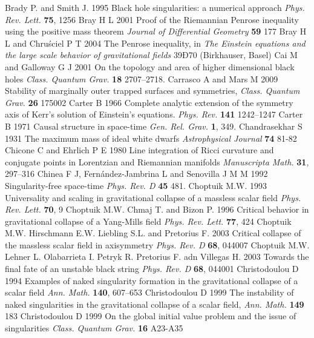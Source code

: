 \documentclass[12pt]{iopart}
\begin{document}
\begin{thebibliography}{999}
 Brady P. and Smith J. 1995 Black hole singularities: a numerical approach {\it Phys. Rev. Lett.} {\bf 75}, 1256
 Bray H L 2001 Proof of the Riemannian Penrose inequality using the positive mass theorem {\it Journal of Differential Geometry} {\bf 59} 177
 Bray H L and Chru\'{s}ciel P T 2004 The Penrose inequality, in {\it The Einstein equations and the large scale behavior of gravitational fields} 39Ð70 (Birkhauser, Basel)
 Cai M and Galloway G J 2001 On the topology and area of higher dimensional black holes {\it Class. Quantum Grav.} {\bf 18} 2707--2718.%
 Carrasco A and Mars M 2009 Stability of marginally outer trapped surfaces and symmetries, {\it Class. Quantum Grav.} {\bf 26} 175002 
 Carter B 1966 Complete analytic extension of the symmetry axis of Kerr's solution of Einstein's equations. {\it Phys. Rev.} {\bf 141} 1242--1247
 Carter B 1971 Causal structure in space-time {\it Gen. Rel. Grav.} {\bf 1}, 349.%
 Chandrasekhar S 1931 The maximum mass of ideal white dwarfs {\it Astrophysical Journal} {\bf 74} 81-82
 Chicone C and Ehrlich P E 1980 Line integration of Ricci curvature and conjugate points in Lorentzian and Riemannian manifolds {\it Manuscripta Math.} {\bf 31},
297--316
 Chinea F J, Fern\'andez-Jambrina L and Senovilla J M M
1992 Singularity-free space-time {\it Phys. Rev. D} {\bf 45} 481.
 Choptuik M.W. 1993 Universality and scaling in gravitational collapse of a massless scalar field {\it Phys. Rev. Lett.} {\bf 70}, 9
 Choptuik M.W. Chmaj T. and Bizon P. 1996 Critical behavior in gravitational collapse of a Yang-Mills field {\it Phys. Rev. Lett.} {\bf 77}, 424
 Choptuik M.W. Hirschmann E.W. Liebling S.L. and Pretorius F. 2003 Critical collapse of the massless scalar field in axisymmetry {\it Phys. Rev. D} {\bf 68}, 044007
 Choptuik M.W. Lehner L. Olabarrieta I. Petryk R. Pretorius F. adn Villegas H. 2003 Towards the final fate of an unstable black string {\it Phys. Rev. D} {\bf 68}, 044001
 Christodoulou D 1994 Examples of naked singularity formation in the gravitational collapse of a scalar field {\it Ann. Math.} {\bf 140}, 607--653
 Christodoulou D 1999 The instability of naked singularities in the gravitational collapse of a scalar field, {\it Ann. Math.} {\bf 149} 183
 Christodoulou D 1999 On the global initial value problem and the issue of singularities {\it Class. Quantum Grav.} {\bf 16} A23-A35

\end{thebibliography}
\end{document}
